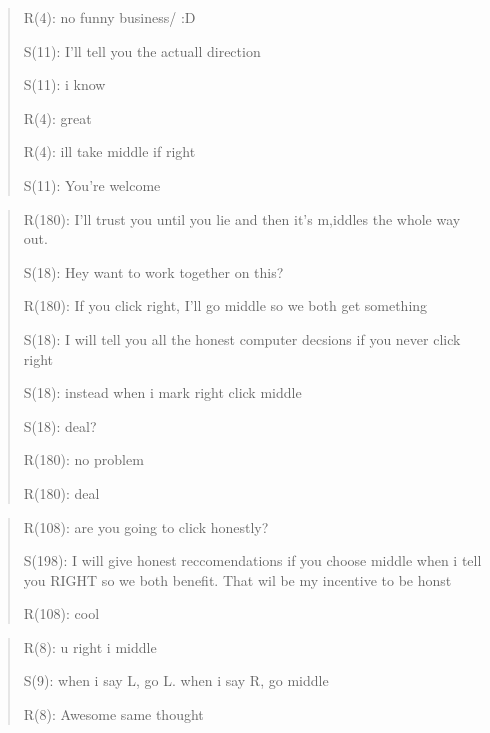\documentclass{beamer}
\begin{document}
\begin{frame}
    \begin{card}
        \begin{quotation}
        R(4): no funny business/ :D 
        
        S(11): I'll tell you the actuall direction 
        
        S(11): i know 
        
        R(4): great 
        
        R(4): ill take middle if right 
        
        S(11): You're welcome
        \end{quotation}
    \end{card}
\end{frame}
\begin{frame}
    \begin{card}
\begin{quotation}
       R(180): I'll trust you until you lie and then it's m,iddles the whole
way out. 

S(18): Hey want to work together on this? 

R(180): If you click right, I'll go middle so we both get something 

S(18): I will tell you all the honest computer decsions if you never
click right 

S(18): instead when i mark right click middle 

S(18): deal? 

R(180): no problem 

R(180): deal
\end{quotation}
    \end{card}
\end{frame}

\begin{frame}
    \begin{card}
\begin{quotation}
R(108): are you going to click honestly? 

S(198): I will give honest reccomendations if you choose middle when
i tell you RIGHT so we both benefit. That wil be my incentive to be
honst 

R(108): cool
\end{quotation}
    \end{card}
\end{frame}

\begin{frame}
    \begin{card}
\begin{quotation}
R(8): u right i middle 

S(9): when i say L, go L. when i say R, go middle 

R(8): Awesome same thought 
\end{quotation}
    \end{card}
\end{frame}
\end{document}
